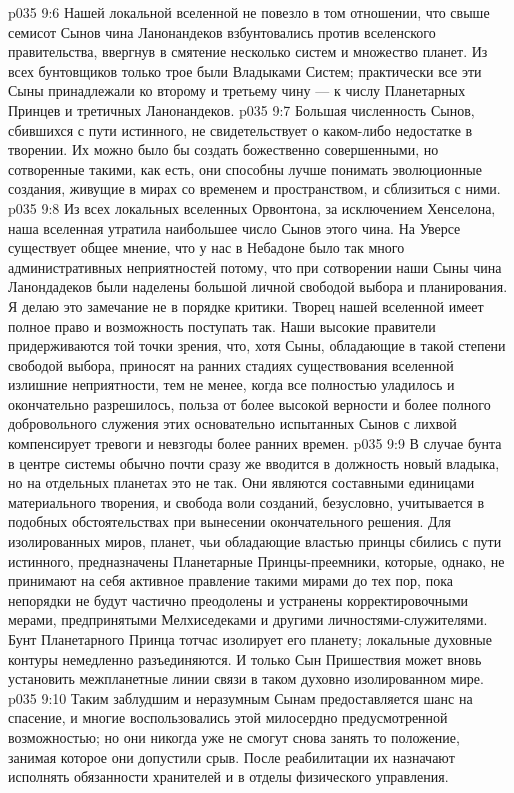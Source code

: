 \vs p035 9:6 Нашей локальной вселенной не повезло в том отношении, что свыше семисот Сынов чина Ланонандеков взбунтовались против вселенского правительства, ввергнув в смятение несколько систем и множество планет. Из всех бунтовщиков только трое были Владыками Систем; практически все эти Сыны принадлежали ко второму и третьему чину --- к числу Планетарных Принцев и третичных Ланонандеков.
\vs p035 9:7 Большая численность Сынов, сбившихся с пути истинного, не свидетельствует о каком\hyp{}либо недостатке в творении. Их можно было бы создать божественно совершенными, но сотворенные такими, как есть, они способны лучше понимать эволюционные создания, живущие в мирах со временем и пространством, и сблизиться с ними.
\vs p035 9:8 Из всех локальных вселенных Орвонтона, за исключением Хенселона, наша вселенная утратила наибольшее число Сынов этого чина. На Уверсе существует общее мнение, что у нас в Небадоне было так много административных неприятностей потому, что при сотворении наши Сыны чина Ланондадеков были наделены большой личной свободой выбора и планирования. Я делаю это замечание не в порядке критики. Творец нашей вселенной имеет полное право и возможность поступать так. Наши высокие правители придерживаются той точки зрения, что, хотя Сыны, обладающие в такой степени свободой выбора, приносят на ранних стадиях существования вселенной излишние неприятности, тем не менее, когда все полностью уладилось и окончательно разрешилось, польза от более высокой верности и более полного добровольного служения этих основательно испытанных Сынов с лихвой компенсирует тревоги и невзгоды более ранних времен.
\vs p035 9:9 \pc В случае бунта в центре системы обычно почти сразу же вводится в должность новый владыка, но на отдельных планетах это не так. Они являются составными единицами материального творения, и свобода воли созданий, безусловно, учитывается в подобных обстоятельствах при вынесении окончательного решения. Для изолированных миров, планет, чьи обладающие властью принцы сбились с пути истинного, предназначены Планетарные Принцы\hyp{}преемники, которые, однако, не принимают на себя активное правление такими мирами до тех пор, пока непорядки не будут частично преодолены и устранены корректировочными мерами, предпринятыми Мелхиседеками и другими личностями\hyp{}служителями. Бунт Планетарного Принца тотчас изолирует его планету; локальные духовные контуры немедленно разъединяются. И только Сын Пришествия может вновь установить межпланетные линии связи в таком духовно изолированном мире.
\vs p035 9:10 Таким заблудшим и неразумным Сынам предоставляется шанс на спасение, и многие воспользовались этой милосердно предусмотренной возможностью; но они никогда уже не смогут снова занять то положение, занимая которое они допустили срыв. После реабилитации их назначают исполнять обязанности хранителей и в отделы физического управления.

